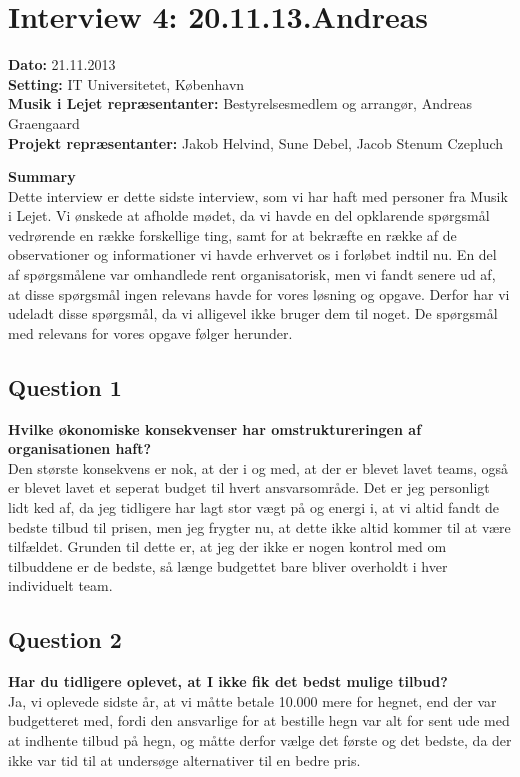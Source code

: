 \section{Interview 4: 20.11.13.Andreas}
\label{sec:interview_4}

\textbf{Dato:} 21.11.2013 \\
\textbf{Setting:} IT Universitetet, København \\
\textbf{Musik i Lejet repræsentanter:} Bestyrelsesmedlem og arrangør, Andreas Graengaard  \\
\textbf{Projekt repræsentanter:} Jakob Helvind, Sune Debel, Jacob Stenum Czepluch

\bigskip

\noindent \textbf{Summary} \\
Dette interview er dette sidste interview, som vi har haft med personer fra Musik i Lejet. Vi
ønskede at afholde mødet, da vi havde en del opklarende spørgsmål vedrørende en række forskellige
ting, samt for at bekræfte en række af de observationer og informationer vi havde erhvervet os i
forløbet indtil nu. En del af spørgsmålene var omhandlede \mil rent organisatorisk, men vi fandt
senere ud af, at disse spørgsmål ingen relevans havde for vores løsning og opgave. Derfor har vi
udeladt disse spørgsmål, da vi alligevel ikke bruger dem til noget. De spørgsmål med relevans for
vores opgave følger herunder.

\subsection{Question 1}
\label{sub:i4q1}
\noindent \textbf{Hvilke økonomiske konsekvenser har omstruktureringen af organisationen haft?} 
\\
Den største konsekvens er nok, at der i og med, at der er blevet lavet teams, også er blevet lavet
et seperat budget til hvert ansvarsområde. Det er jeg personligt lidt ked af, da jeg tidligere har
lagt stor vægt på og energi i, at vi altid fandt de bedste tilbud til prisen, men jeg frygter nu, at
dette ikke altid kommer til at være tilfældet. Grunden til dette er, at jeg der ikke er nogen
kontrol med om tilbuddene er de bedste, så længe budgettet bare bliver overholdt i hver individuelt
team.

\subsection{Question 2}
\label{sub:i4q2}
\noindent \textbf{Har du tidligere oplevet, at I ikke fik det bedst mulige tilbud?}
\\
Ja, vi oplevede sidste år, at vi måtte betale 10.000 mere for hegnet, end der var budgetteret med,
fordi den ansvarlige for at bestille hegn var alt for sent ude med at indhente tilbud på hegn, og
måtte derfor vælge det første og det bedste, da der ikke var tid til at undersøge alternativer til
en bedre pris.

